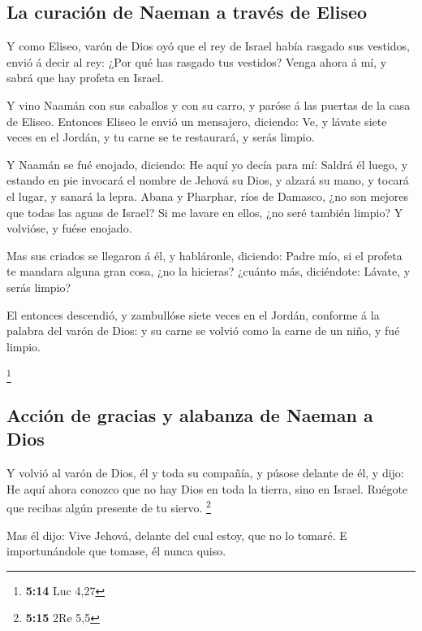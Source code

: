 \hypertarget{la-curaciuxf3n-de-naeman-a-travuxe9s-de-eliseo}{%
\subsection{La curación de Naeman a través de
Eliseo}\label{la-curaciuxf3n-de-naeman-a-travuxe9s-de-eliseo}}

 Y como Eliseo, varón de Dios oyó que el rey de Israel había
rasgado sus vestidos, envió á decir al rey: ¿Por qué has rasgado tus
vestidos? Venga ahora á mí, y sabrá que hay profeta en Israel.

 Y vino Naamán con sus caballos y con su carro, y paróse á
las puertas de la casa de Eliseo.  Entonces Eliseo le envió
un mensajero, diciendo: Ve, y lávate siete veces en el Jordán, y tu
carne se te restaurará, y serás limpio.

 Y Naamán se fué enojado, diciendo: He aquí yo decía para
mí: Saldrá él luego, y estando en pie invocará el nombre de Jehová su
Dios, y alzará su mano, y tocará el lugar, y sanará la lepra.
 Abana y Pharphar, ríos de Damasco, ¿no son mejores que
todas las aguas de Israel? Si me lavare en ellos, ¿no seré también
limpio? Y volvióse, y fuése enojado.

 Mas sus criados se llegaron á él, y habláronle, diciendo:
Padre mío, si el profeta te mandara alguna gran cosa, ¿no la hicieras?
¿cuánto más, diciéndote: Lávate, y serás limpio?

 El entonces descendió, y zambullóse siete veces en el
Jordán, conforme á la palabra del varón de Dios: y su carne se volvió
como la carne de un niño, y fué limpio.

\footnote{\textbf{5:14} Luc 4,27}

\hypertarget{acciuxf3n-de-gracias-y-alabanza-de-naeman-a-dios}{%
\subsection{Acción de gracias y alabanza de Naeman a
Dios}\label{acciuxf3n-de-gracias-y-alabanza-de-naeman-a-dios}}

 Y volvió al varón de Dios, él y toda su compañía, y púsose
delante de él, y dijo: He aquí ahora conozco que no hay Dios en toda la
tierra, sino en Israel. Ruégote que recibas algún presente de tu siervo.
\footnote{\textbf{5:15} 2Re 5,5}

 Mas él dijo: Vive Jehová, delante del cual estoy, que no
lo tomaré. E importunándole que tomase, él nunca quiso.

